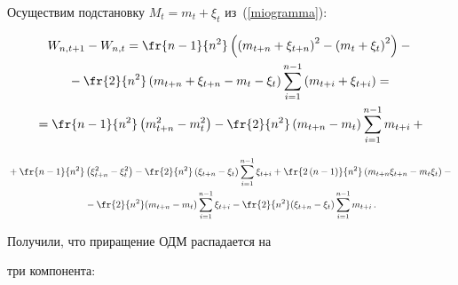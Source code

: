     Осуществим подстановку $M_t = m_t + \xi_t$ из~(\ref{miogramma}):


    \begin{multline*}


        W_{n,t+1} - W_{n,t} =


            \fr{n-1}{n^2}\left(\left(m_{t+n} + \xi_{t+n}\right)^2 -


            \left(m_t + \xi_t\right)^2\right) - {}\\


             {}- \fr{2}{n^2}\left(m_{t+n} + \xi_{t+n} - m_t -


             \xi_t\right)\sum\limits^{n-1}_{i=1}\left(m_{t+i} + \xi_{t+i}\right) = {}\\


             {} =


            \fr{n-1}{n^2}\left(m^2_{t+n} - m^2_t\right) -


            \fr{2}{n^2}\left(m_{t+n}-m_t\right)\sum\limits^{n-1}_{i=1}m_{t+i} + {}


                                     \end{multline*}





\noindent


\begin{multline*}


            {} + \fr{n-1}{n^2}\left(\xi^2_{t+n} - \xi^2_t\right) -


            \fr{2}{n^2}\left(\xi_{t+n}-\xi_t\right)\sum\limits^{n-1}_{i=1}


            \xi_{t+i} + \fr{2\left(n-1\right)}{n^2}\left(m_{t+n}\xi_{t+n} -


            m_t\xi_t\right) - {}\\


            {} -  \fr{2}{n^2}(m_{t+n}-m_t)\sum\limits^{n-1}_{i=1}\xi_{t+i} -


            \fr{2}{n^2}(\xi_{t+n}-\xi_t)\sum\limits^{n-1}_{i=1}m_{t+i}\,.


    \end{multline*}





    Получили, что приращение ОДМ распадается на


    три компонента:



